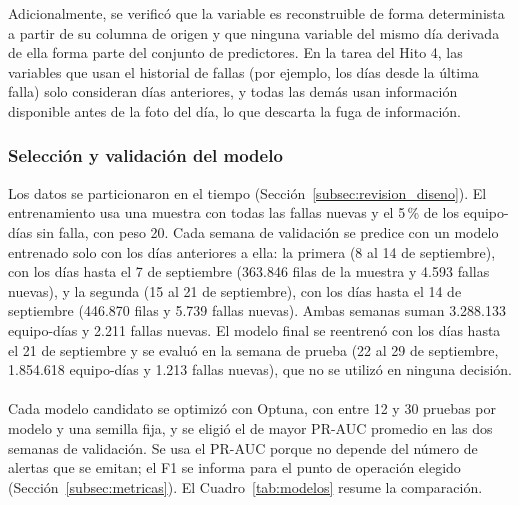 \documentclass[12pt,a4paper]{article}
\begin{document}
\noindent
Adicionalmente, se verificó que la variable es reconstruible de forma
determinista a partir de su columna de origen y que ninguna variable del mismo
día derivada de ella forma parte del conjunto de predictores. En la tarea del
Hito 4, las variables que usan el historial de fallas (por ejemplo, los días
desde la última falla) solo consideran días anteriores, y todas las demás usan
información disponible antes de la foto del día, lo que descarta la fuga de
información.

\subsubsection{Selección y validación del modelo}
\label{subsec:validacion_modelo}
\noindent
Los datos se particionaron en el tiempo (Sección~\ref{subsec:revision_diseno}).
El entrenamiento usa una muestra con todas las fallas nuevas y el 5\,\% de los
equipo-días sin falla, con peso 20. Cada semana de validación se predice con un
modelo entrenado solo con los días anteriores a ella: la primera (8 al 14 de
septiembre), con los días hasta el 7 de septiembre (363.846 filas de la
muestra y 4.593 fallas nuevas), y la segunda (15 al 21 de septiembre), con los
días hasta el 14 de septiembre (446.870 filas y 5.739 fallas nuevas). Ambas
semanas suman 3.288.133 equipo-días y 2.211 fallas nuevas. El modelo final se
reentrenó con los días hasta el 21 de septiembre y se evaluó en la semana de
prueba (22 al 29 de septiembre, 1.854.618 equipo-días y 1.213 fallas nuevas),
que no se utilizó en ninguna decisión.\\\\

\noindent
Cada modelo candidato se optimizó con Optuna, con entre 12 y 30 pruebas por
modelo y una semilla fija, y se eligió el de mayor PR-AUC promedio en las dos
semanas de validación. Se usa el PR-AUC porque no depende del número de alertas
que se emitan; el F1 se informa para el punto de operación elegido
(Sección~\ref{subsec:metricas}). El Cuadro~\ref{tab:modelos} resume la comparación.
\end{document}
